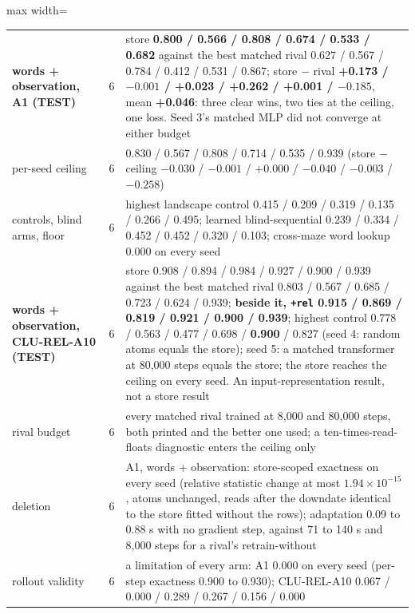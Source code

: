 \documentclass{article} %
\newcommand{\sci}[2]{\ensuremath{#1\times10^{#2}}}
\begin{document}
\begin{table}[h]
\begin{adjustbox}{max width=\linewidth}
\begin{tabular}{p{2.2cm}p{0.6cm}p{10.3cm}}
\midrule
\textbf{words + observation, A1 (TEST)} & 6 & store \textbf{0.800 / 0.566 / 0.808 / 0.674 / 0.533 / 0.682} against the best matched rival 0.627 / 0.567 / 0.784 / 0.412 / 0.531 / 0.867; store $-$ rival \textbf{+0.173 / $-0.001$ / +0.023 / +0.262 / +0.001 / $-0.185$}, mean \textbf{+0.046}: three clear wins, two ties at the ceiling, one loss. Seed 3's matched MLP did not converge at either budget \\
\quad per-seed ceiling & 6 & 0.830 / 0.567 / 0.808 / 0.714 / 0.535 / 0.939 (store $-$ ceiling $-0.030$ / $-0.001$ / +0.000 / $-0.040$ / $-0.003$ / $-0.258$) \\
\quad controls, blind arms, floor & 6 & highest landscape control 0.415 / 0.209 / 0.319 / 0.135 / 0.266 / 0.495; learned blind-sequential 0.239 / 0.334 / 0.452 / 0.452 / 0.320 / 0.103; cross-maze word lookup 0.000 on every seed \\
\textbf{words + observation, CLU-REL-A10 (TEST)} & 6 & store 0.908 / 0.894 / 0.984 / 0.927 / 0.900 / 0.939 against the best matched rival 0.803 / 0.567 / 0.685 / 0.723 / 0.624 / 0.939; \textbf{beside it, \texttt{+rel} 0.915 / 0.869 / 0.819 / 0.921 / 0.900 / 0.939}; highest control 0.778 / 0.563 / 0.477 / 0.698 / \textbf{0.900} / 0.827 (seed 4: random atoms equals the store); seed 5: a matched transformer at 80,000 steps equals the store; the store reaches the ceiling on every seed. An input-representation result, not a store result \\
\midrule
rival budget & 6 & every matched rival trained at 8,000 and 80,000 steps, both printed and the better one used; a ten-times-read-floats diagnostic enters the ceiling only \\
deletion & 6 & A1, words + observation: store-scoped exactness on every seed (relative statistic change at most \sci{1.94}{-15}, atoms unchanged, reads after the downdate identical to the store fitted without the rows); adaptation 0.09 to 0.88 s with no gradient step, against 71 to 140 s and 8,000 steps for a rival's retrain-without \\
rollout validity & 6 & a limitation of every arm: A1 0.000 on every seed (per-step exactness 0.900 to 0.930); CLU-REL-A10 0.067 / 0.000 / 0.289 / 0.267 / 0.156 / 0.000 \\
\bottomrule
\end{tabular}\end{adjustbox}
\end{table}
\end{document}
